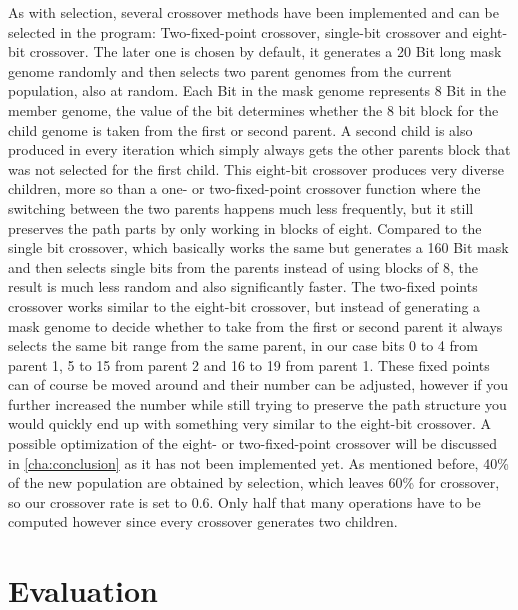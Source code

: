 As with selection, several crossover methods have been implemented and can be selected in the program: Two-fixed-point crossover, single-bit crossover and eight-bit crossover. The later one is chosen by default, it generates a 20 Bit long mask genome randomly and then selects two parent genomes from the current population, also at random. Each Bit in the mask genome represents 8 Bit in the member genome, the value of the bit determines whether the 8 bit block for the child genome is taken from the first or second parent. A second child is also produced in every iteration which simply always gets the other parents block that was not selected for the first child. This eight-bit crossover produces very diverse children, more so than a one- or two-fixed-point crossover function where the switching between the two parents happens much less frequently, but it still preserves the path parts by only working in blocks of eight. Compared to the single bit crossover, which basically works the same but generates a 160 Bit mask and then selects single bits from the parents instead of using blocks of 8, the result is much less random and also significantly faster.
The two-fixed points crossover works similar to the eight-bit crossover, but instead of generating a mask genome to decide whether to take from the first or second parent it always selects the same bit range from the same parent, in our case bits 0 to 4 from parent 1, 5 to 15 from parent 2 and 16 to 19 from parent 1. These fixed points can of course be moved around and their number can be adjusted, however if you further increased the number while still trying to preserve the path structure you would quickly end up with something very similar to the eight-bit crossover.
A possible optimization of the eight- or two-fixed-point crossover will be discussed in \ref{cha:conclusion} as it has not been implemented yet.
As mentioned before, 40\% of the new population are obtained by selection, which leaves 60\% for crossover, so our crossover rate is set to 0.6. Only half that many operations have to be computed however since every crossover generates two children.

\section{Evaluation} %
\label{sec:imp_evaluation}

